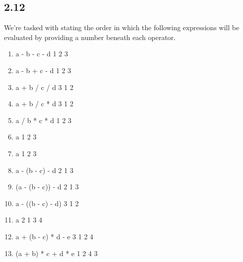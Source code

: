 \documentclass[leqno, 11pt]{article}
\begin{document}
\subsection*{2.12}
We're tasked with stating the order in which the following expressions will be evaluated by providing a number beneath each operator.
\begin{enumerate}[label=\alph*.]
  \itemsep-1em
  \item \begin{verbbox}
a - b - c - d
  1   2   3
        \end{verbbox}
        \theverbbox
  \item \begin{verbbox}
a - b + c - d
  1   2   3
        \end{verbbox}
        \theverbbox
  \item \begin{verbbox}
a + b / c / d
  3   1   2
        \end{verbbox}
        \theverbbox
  \item \begin{verbbox}
a + b / c * d
  3   1   2
        \end{verbbox}
        \theverbbox
  \item \begin{verbbox}
a / b * c * d
  1   2   3
        \end{verbbox}
        \theverbbox
  \item \begin{verbbox}
a %
  1   2   3
        \end{verbbox}
        \theverbbox
  \item \begin{verbbox}
a %
  1   2   3
        \end{verbbox}
        \theverbbox
  \item \begin{verbbox}
a - (b - c) - d
  2    1    3
        \end{verbbox}
        \theverbbox
  \item \begin{verbbox}
(a - (b - c)) - d
   2    1     3
        \end{verbbox}
        \theverbbox
  \item \begin{verbbox}
a - ((b - c) - d)
  3     1    2
        \end{verbbox}
        \theverbbox
  \item \begin{verbbox}
a %
  2    1    3   4
        \end{verbbox}
        \theverbbox
  \item \begin{verbbox}
a + (b - c) * d - e
  3    1    2   4
        \end{verbbox}
        \theverbbox
  \item \begin{verbbox}
(a + b) * c + d * e
   1    2   4   3
        \end{verbbox}
        \theverbbox
\end{enumerate}
\end{document}
